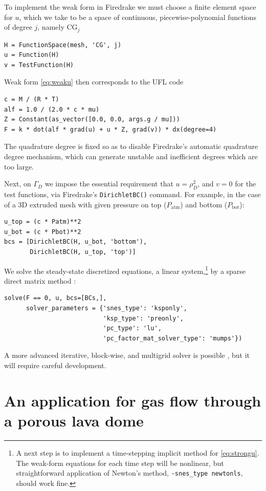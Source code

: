 \documentclass[11pt]{amsart}
\newcommand{\Patm}{P_{\text{atm}}}
\newcommand{\Pbot}{P_{\text{bot}}}
\begin{document}
To implement the weak form in Firedrake we must choose a finite element space for $u$, which we take to be a space of continuous, piecewise-polynomial functions of degree $j$, namely $\text{CG}_j$ \citep{Elman2014}
\begin{Verbatim}[fontsize=\small,frame=lines]
H = FunctionSpace(mesh, 'CG', j)
u = Function(H)
v = TestFunction(H)
\end{Verbatim}
Weak form \eqref{eq:weaku} then corresponds to the UFL code
\begin{Verbatim}[fontsize=\small,frame=lines]
c = M / (R * T)
alf = 1.0 / (2.0 * c * mu)
Z = Constant(as_vector([0.0, 0.0, args.g / mu]))
F = k * dot(alf * grad(u) + u * Z, grad(v)) * dx(degree=4)
\end{Verbatim}
The quadrature degree is fixed so as to disable Firedrake's automatic quadrature degree mechanism, which can generate unstable and inefficient degrees which are too large.

Next, on $\Gamma_D$ we impose the essential requirement that $u=\rho_D^2$, and $v=0$ for the test functions, via Firedrake's \verb|DirichletBC()| command.  For example, in the case of a 3D extruded mesh with given pressure on top ($\Patm$) and bottom ($\Pbot$):
\begin{Verbatim}[fontsize=\small,frame=lines]
u_top = (c * Patm)**2
u_bot = (c * Pbot)**2
bcs = [DirichletBC(H, u_bot, 'bottom'),
       DirichletBC(H, u_top, 'top')]
\end{Verbatim}

We solve the steady-state discretized equations, a linear system,\footnote{A next step is to implement a time-stepping implicit method for \eqref{eq:strongu}.  The weak-form equations for each time step will be nonlinear, but straightforward application of Newton's method, \texttt{-snes\_type newtonls}, should work fine.} by a sparse direct matrix method \citep{Amestoy2001}:
\begin{Verbatim}[fontsize=\small,frame=lines]
solve(F == 0, u, bcs=[BCs,],
      solver_parameters = {'snes_type': 'ksponly',
                           'ksp_type': 'preonly',
                           'pc_type': 'lu',
                           'pc_factor_mat_solver_type': 'mumps'})
\end{Verbatim}
A more advanced iterative, block-wise, and multigrid solver is possible \citep[e.g.][]{Bueler2021}, but it will require careful development.


\section{An application for gas flow through a porous lava dome}
\end{document}
